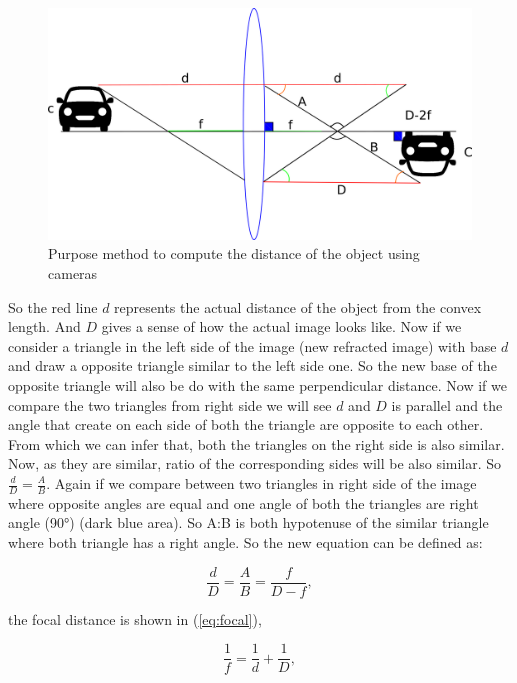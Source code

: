\begin{figure}[H]
\centering
\includegraphics[width=\textwidth]{imagens/desenhando.png}
\caption{Purpose method to compute the distance of the object using cameras}
\label{fig:distance}
\end{figure}


So the red line $d$ represents the actual distance of the object from the convex length. And $D$ gives a sense of how the actual image looks like. Now if we consider a triangle in the left side of the image (new refracted image) with base $d$ and draw a opposite triangle similar to the left side one. So the new base of the opposite triangle will also be do with the same perpendicular distance. Now if we compare the two triangles from right side we will see $d$ and $D$ is parallel and the angle that create on each side of both the triangle are opposite to each other. From which we can infer that, both the triangles on the right side is also similar. Now, as they are similar, ratio of the corresponding sides will be also similar. So $\frac{d}{D} = \frac{A}{B}$. Again if we compare between two triangles in right side of the image where opposite angles are equal and one angle of both the triangles are right angle (90°) (dark blue area). So A:B is both hypotenuse of the similar triangle where both triangle has a right angle. So the new equation can be defined as:

    \begin{equation}\label{eq:meausure}
        \frac{d}{D} = \frac{A}{B} = \frac{f}{D-f},
    \end{equation}

 the focal distance is shown in (\ref{eq:focal}), 

\begin{equation}\label{eq:focal}
    \frac{1}{f} = \frac{1}{d} + \frac{1}{D},
\end{equation}

